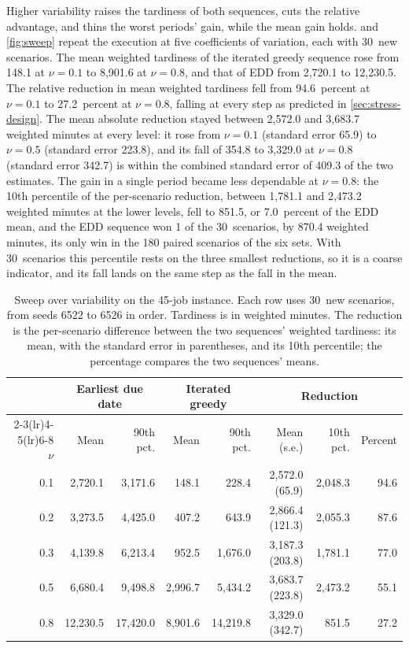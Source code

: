 \sumpara Higher variability raises the tardiness of both sequences, cuts the relative advantage, and thins the worst periods' gain, while the mean gain holds. \sumparaend
\fin {} and \cref{fig:sweep} repeat the execution at five coefficients of variation, each with 30~new scenarios. \fine
\fin The mean weighted tardiness of the iterated greedy sequence rose from 148.1 at $\nu = 0.1$ to 8,901.6 at $\nu = 0.8$, and that of EDD from 2,720.1 to 12,230.5. \fine
\fin The relative reduction in mean weighted tardiness fell from 94.6~percent at $\nu = 0.1$ to 27.2~percent at $\nu = 0.8$, falling at every step as predicted in \cref{sec:stress-design}. \fine
\fin The mean absolute reduction stayed between 2,572.0 and 3,683.7 weighted minutes at every level: it rose from $\nu = 0.1$ (standard error 65.9) to $\nu = 0.5$ (standard error 223.8), and its fall of 354.8 to 3,329.0 at $\nu = 0.8$ (standard error 342.7) is within the combined standard error of 409.3 of the two estimates. \fine
\fin The gain in a single period became less dependable at $\nu = 0.8$: the 10th percentile of the per-scenario reduction, between 1,781.1 and 2,473.2 weighted minutes at the lower levels, fell to 851.5, or 7.0~percent of the EDD mean, and the EDD sequence won 1 of the 30~scenarios, by 870.4 weighted minutes, its only win in the 180 paired scenarios of the six sets. \fine
\fin With 30~scenarios this percentile rests on the three smallest reductions, so it is a coarse indicator, and its fall lands on the same step as the fall in the mean. \fine

\begin{table}[ht]
\centering
\caption{Sweep over variability on the 45-job instance. Each row uses 30~new scenarios, from seeds 6522 to 6526 in order. Tardiness is in weighted minutes. The reduction is the per-scenario difference between the two sequences' weighted tardiness: its mean, with the standard error in parentheses, and its 10th percentile; the percentage compares the two sequences' means.}
\label{tab:sweep}
\small
\setlength{\tabcolsep}{4.5pt}
\begin{tabular}{rrrrrrrr}
\toprule
 & \multicolumn{2}{c}{Earliest due date} & \multicolumn{2}{c}{Iterated greedy} & \multicolumn{3}{c}{Reduction} \\
\cmidrule(lr){2-3}\cmidrule(lr){4-5}\cmidrule(lr){6-8}
$\nu$ & Mean & 90th pct. & Mean & 90th pct. & Mean (s.e.) & 10th pct. & Percent \\
\midrule
0.1 & 2,720.1 & 3,171.6 & 148.1 & 228.4 & 2,572.0 (65.9) & 2,048.3 & 94.6 \\
0.2 & 3,273.5 & 4,425.0 & 407.2 & 643.9 & 2,866.4 (121.3) & 2,055.3 & 87.6 \\
0.3 & 4,139.8 & 6,213.4 & 952.5 & 1,676.0 & 3,187.3 (203.8) & 1,781.1 & 77.0 \\
0.5 & 6,680.4 & 9,498.8 & 2,996.7 & 5,434.2 & 3,683.7 (223.8) & 2,473.2 & 55.1 \\
0.8 & 12,230.5 & 17,420.0 & 8,901.6 & 14,219.8 & 3,329.0 (342.7) & 851.5 & 27.2 \\
\bottomrule
\end{tabular}
\end{table}

